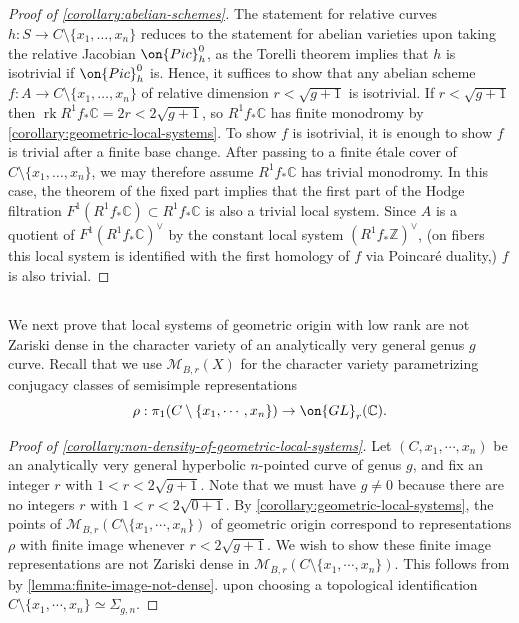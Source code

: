 \documentclass[12 pt]{amsart}
\theoremstyle{plain}
\theoremstyle{definition}
\theoremstyle{remark}
\numberwithin{equation}{section}
\DeclareMathOperator\rk{rk}
\begin{document}
\subsection{}
\label{subsubsection:abelian-scheme-proof}
\begin{proof}[Proof of \autoref{corollary:abelian-schemes}]
	The statement for relative curves $h: S \to C \setminus \{x_1, \ldots, x_n\}$ reduces to the statement for abelian varieties
	upon taking the relative Jacobian $\on{Pic}^0_h$, as the Torelli theorem implies that
	$h$ is isotrivial if $\on{Pic}^0_h$ is.
	Hence, it suffices to show that any abelian scheme $f: A \to C \setminus\{x_1,
	\ldots, x_n\}$ of relative dimension $r < \sqrt{g+1}$ is isotrivial.
	If $r < \sqrt{g+1}$ then $\rk R^1 f_* \mathbb C = 2r < 2 \sqrt{g+1}$, so $R^1 f_* \mathbb C$ has
	finite monodromy by \autoref{corollary:geometric-local-systems}.
	To show $f$ is isotrivial, it is enough to show $f$ is trivial after a finite base change. 
	After passing to a finite \'etale cover of
	$C \setminus\{x_1,\ldots, x_n\}$, we may therefore assume
	$R^1 f_* \mathbb C$ has trivial monodromy.
	In this case, the theorem of the fixed part 
	\cite[Corollaire 4.1.2]{deligne:hodge-ii}
	implies that the first part of the Hodge filtration $F^1(R^1 f_* \mathbb
	C) \subset R^1 f_* \mathbb C$ is also a trivial local system.
	Since $A$ is a quotient of 
	$F^1(R^1 f_* \mathbb C)^\vee$ by the constant local system
	$(R^1 f_* \mathbb Z)^\vee$,
	(on fibers this local system is identified with the first homology of $f$
	via Poincar\'e duality,)
	$f$ is also trivial.
\end{proof}


\subsection{}\label{subsubsection:non-density-proof}
We next prove that local systems of geometric origin with low rank are not
Zariski dense in the character variety of an analytically very general genus $g$
curve.
Recall that we use $\mathscr{M}_{B,r}(X)$ for the character variety
parametrizing conjugacy classes of semisimple representations $$\rho:
\pi_1(C\setminus\{x_1, \cdots, x_n\})\to \on{GL}_r(\mathbb{C}).$$

\begin{proof}[Proof of \autoref{corollary:non-density-of-geometric-local-systems}]
Let $(C, x_1, \cdots, x_n)$ be an analytically very general hyperbolic
$n$-pointed curve of genus $g$, and fix an integer $r$ with $1<r<2\sqrt{g+1}$. 
Note that we must have $g \neq 0$ because there are no integers $r$ with $1 < r
< 2 \sqrt{0 + 1}$.
By \autoref{corollary:geometric-local-systems}, the points of
$\mathscr{M}_{B,r}(C\setminus\{x_1, \cdots, x_n\})$ of geometric origin
correspond to representations $\rho$ with finite image whenever $r < 2
\sqrt{g+1}$. 
We wish to show these finite image representations are not Zariski dense in
$\mathscr{M}_{B,r}(C\setminus\{x_1, \cdots, x_n\})$.
This follows from
by \autoref{lemma:finite-image-not-dense}.
upon choosing a topological identification $C\setminus\{x_1, \cdots, x_n\} \simeq
\Sigma_{g,n}$. 
\end{proof}
\end{document}
